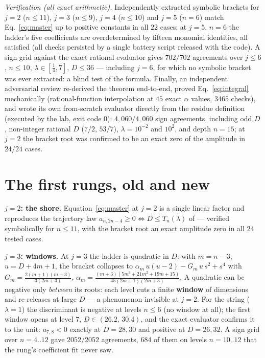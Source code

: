 \documentclass[11pt]{article}
\begin{document}
\emph{Verification (all exact arithmetic).} Independently extracted symbolic
brackets for $j=2$ ($n\le11$), $j=3$ ($n\le9$), $j=4$ ($n\le10$) and $j=5$
($n=6$) match Eq.~\eqref{eq:master} up to positive constants in all $22$
cases; at $j{=}5$, $n{=}6$ the ladder's five coefficients are overdetermined
by fifteen monomial identities, all satisfied (all checks persisted by a
single battery script released with the code). A sign grid against the exact
rational evaluator gives $702/702$ agreements over $j\le6$, $n\le10$,
$\lambda\in[\tfrac14,7]$, $D\le36$ --- including $j{=}6$, for which no
symbolic bracket was ever extracted: a blind test of the formula. Finally, an independent adversarial
review re-derived the theorem end-to-end, proved
Eq.~\eqref{eq:integral} mechanically (rational-function interpolation at
$45$ exact $\alpha$ values, $3465$ checks), and wrote its own from-scratch evaluator directly from the residue
definition (executed by the lab, exit code $0$):
$4{,}060/4{,}060$ sign agreements, including odd $D$, non-integer rational
$D$ ($7/2$, $53/7$), $\lambda=10^{-2}$ and $10^{2}$, and depth $n=15$; at
$j{=}2$ the bracket root was confirmed to be an exact zero of the amplitude
in $24/24$ cases.

\section{The first rungs, old and new}

\textbf{$j=2$: the shore.} Equation~\eqref{eq:master} at $j{=}2$ is a single
linear factor and reproduces the trajectory law
$a_{n,2n-4}\ge0\iff D\le T_n(\lambda)$ of \cite{shore} --- verified
symbolically for $n\le11$, with the bracket root an exact amplitude zero in
all $24$ tested cases.

\textbf{$j=3$: windows.} At $j{=}3$ the ladder is quadratic in $D$: with
$m=n-3$, $u=D+4m+1$, the bracket collapses to
$\alpha_m\,u(u-2)-G_m\,u\,s^2+s^4$ with
$G_m=\tfrac{2(m+1)(m+3)}{3(2m+3)}$,
$\alpha_m=\tfrac{(m+3)(5m^3+21m^2+19m+15)}{45(2m+1)(2m+3)}$. A quadratic can
be negative only \emph{between} its roots: each level cuts a finite
\textbf{window} of dimensions and re-releases at large $D$ --- a phenomenon
invisible at $j=2$. For the string ($\lambda=1$) the discriminant is negative
at levels $n\le6$ (no window at all); the first window opens at level $7$,
$D\in(26.2,\,30.4)$, and the exact evaluator confirms it to the unit:
$a_{7,8}<0$ exactly at $D=28,30$ and positive at $D=26,32$. A sign grid over $n=4..12$ gave $2052/2052$ agreements, $684$ of them on
levels $n=10..12$ that the rung's coefficient fit never saw.
\end{document}
